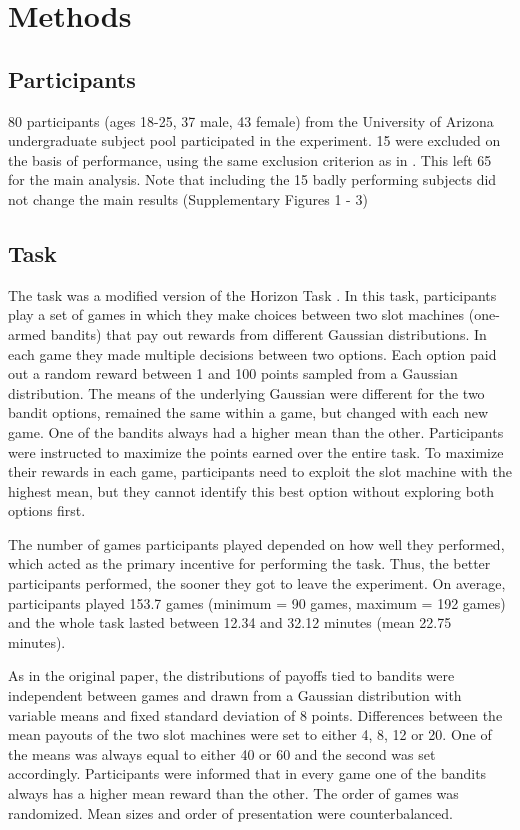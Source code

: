 \documentclass[12pt]{article}
\begin{document}
	\section*{Methods}
	\subsection*{Participants}
	
	80 participants (ages 18-25, 37 male, 43 female) from the University of Arizona undergraduate subject pool participated in the experiment. 15 were excluded on the basis of performance, using the same exclusion criterion as in \citep{wilson2014}. This left 65 for the main analysis. Note that including the 15 badly performing subjects did not change the main results (Supplementary Figures 1 - 3)%
	
	\subsection*{Task}
	The task was a modified version of the Horizon Task \citep{wilson2014}. In this task, participants play a set of games in which they make choices between two slot machines (one-armed bandits) that pay out rewards from different Gaussian distributions. In each game they made multiple decisions between two options. Each option paid out a random reward between 1 and 100 points sampled from a Gaussian distribution. The means of the underlying Gaussian were different for the two bandit options, remained the same within a game, but changed with each new game. One of the bandits always had a higher mean than the other. Participants were instructed to maximize the points earned over the entire task. To maximize their rewards in each game, participants need to exploit the slot machine with the highest mean, but they cannot identify this best option without exploring both options first. 
	
	The number of games participants played depended on how well they performed, which acted as the primary incentive for performing the task. Thus, the better participants performed, the sooner they got to leave the experiment. On average, participants played 153.7 games (minimum = 90 games, maximum = 192 games) and the whole task lasted between 12.34 and 32.12 minutes (mean 22.75 minutes).
	
	As in the original paper, the distributions of payoffs tied to bandits were independent between games and drawn from a Gaussian distribution with variable means and fixed standard deviation of 8 points. Differences between the mean payouts of the two slot machines were set to either 4, 8, 12 or 20. One of the means was always equal to either 40 or 60 and the second was set accordingly. Participants were informed that in every game one of the bandits always has a higher mean reward than the other. The order of games was randomized. Mean sizes and order of presentation were counterbalanced. 
	
\end{document}
